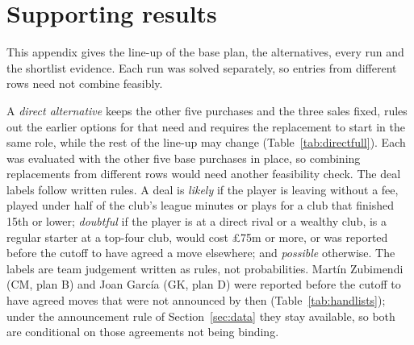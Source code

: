 \section{Supporting results}\label{app:results}

This appendix gives the line-up of the base plan, the alternatives, every run and the shortlist evidence. Each run was solved separately, so entries from different rows need not combine feasibly.

\begin{apptable}
\label{tab:lineup}
\end{apptable}

\begin{apptable}
\label{tab:fullplans}
\end{apptable}

A \emph{direct alternative} keeps the other five purchases and the three sales fixed, rules out the earlier options for that need and requires the replacement to start in the same role, while the rest of the line-up may change (Table~\ref{tab:directfull}). Each was evaluated with the other five base purchases in place, so combining replacements from different rows would need another feasibility check. The deal labels follow written rules. A deal is \emph{likely} if the player is leaving without a fee, played under half of the club's league minutes or plays for a club that finished 15th or lower; \emph{doubtful} if the player is at a direct rival or a wealthy club, is a regular starter at a top-four club, would cost \pounds 75m or more, or was reported before the cutoff to have agreed a move elsewhere; and \emph{possible} otherwise. The labels are team judgement written as rules, not probabilities. Martín Zubimendi (CM, plan B) and Joan García (GK, plan D) were reported before the cutoff to have agreed moves that were not announced by then (Table~\ref{tab:handlists}); under the announcement rule of Section~\ref{sec:data} they stay available, so both are conditional on those agreements not being binding.

\begin{apptable}
\label{tab:directfull}
\end{apptable}


